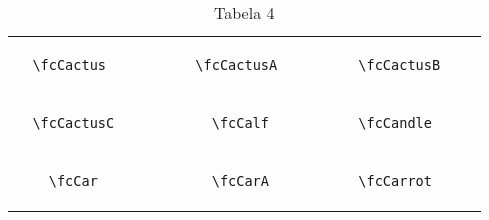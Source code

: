 \documentclass[x11names]{article}
\begin{document}
\begin{table}[H]
\begin{tabular}{|c|c|c|c|c|c|}
		&\multirow{5}{*}{	\fcCactus	[scale=0.4]} & &\multirow{5}{*}{	\fcCactusA	[scale=0.4]} & &\multirow{5}{*}{	\fcCactusB	[scale=0.4]}\\	& & & & & \\	& & & & & \\	\verb|	\fcCactus	| & & \verb|	\fcCactusA	| & & \verb|	\fcCactusB	| & \\	& & & & & \\	& & & & & \\	& & & & & \\	\hline									
		&\multirow{5}{*}{	\fcCactusC	[scale=0.4]} & &\multirow{5}{*}{	\fcCalf	[scale=0.4]} & &\multirow{5}{*}{	\fcCandle	[scale=0.8]}\\	& & & & & \\	& & & & & \\	\verb|	\fcCactusC	| & & \verb|	\fcCalf	| & & \verb|	\fcCandle	| & \\	& & & & & \\	& & & & & \\	& & & & & \\	\hline									
		&\multirow{5}{*}{	\fcCar	[scale=0.8]} & &\multirow{5}{*}{	\fcCarA	[scale=0.4]} & &\multirow{5}{*}{	\fcCarrot	[scale=0.08]}\\	& & & & & \\	& & & & & \\	\verb|	\fcCar	| & & \verb|	\fcCarA	| & & \verb|	\fcCarrot	| & \\	& & & & & \\	& & & & & \\	& & & & & \\		\hline 	\hline 	\end{tabular}	\caption{	Tabela 4	}\label{	Tab4	}\end{table}
\end{document}
